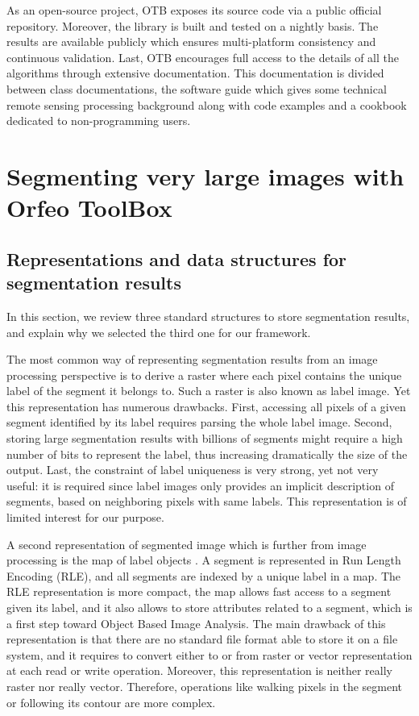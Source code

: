 \documentclass{josis}
\begin{document}
As an open-source project, OTB exposes its source code via a public
official repository. Moreover, the library is built and tested on a
nightly basis. The results are available publicly which ensures
multi-platform consistency and continuous validation. Last, OTB
encourages full access to the details of all the algorithms through
extensive documentation. This documentation is divided between class
documentations, the software guide\cite{} which gives some technical
remote sensing processing background along with code examples and a
cookbook\cite{} dedicated to non-programming users.

\section{Segmenting very large images with Orfeo ToolBox}


\subsection{Representations and data structures for segmentation results}

In this section, we review three standard structures to store
segmentation results, and explain why we selected the third one for
our framework.

The most common way of representing segmentation results from an image
processing perspective is to derive a raster where each pixel contains
the unique label of the segment it belongs to. Such a raster is also
known as label image. Yet this representation has numerous
drawbacks. First, accessing all pixels of a given segment identified
by its label requires parsing the whole label image. Second, storing
large segmentation results with billions of segments might require a
high number of bits to represent the label, thus increasing
dramatically the size of the output. Last, the constraint of label
uniqueness is very strong, yet not very useful: it is required since
label images only provides an implicit description of segments, based
on neighboring pixels with same labels. This representation is of
limited interest for our purpose.

A second representation of segmented image which is further from image
processing is the map of label objects \cite{lehmann2008label}. A
segment is represented in Run Length Encoding (RLE), and all segments
are indexed by a unique label in a map. The RLE representation is more
compact, the map allows fast access to a segment given its label, and
it also allows to store attributes related to a segment, which is a
first step toward Object Based Image Analysis. The main drawback of
this representation is that there are no standard file format able to
store it on a file system, and it requires to convert either to or
from raster or vector representation at each read or write
operation. Moreover, this representation is neither really raster nor
really vector. Therefore, operations like walking pixels in the
segment or following its contour are more complex.
\end{document}
